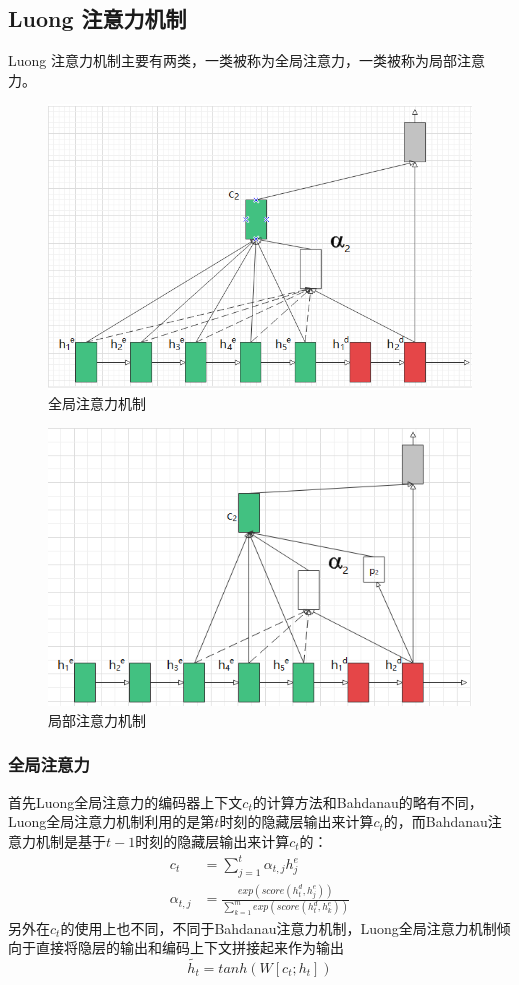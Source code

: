 \documentclass[twoside,a4paper,12pt]{book}%
\begin{document}
\subsection{Luong 注意力机制}
Luong 注意力机制主要有两类，一类被称为全局注意力，一类被称为局部注意力。
\begin{figure}[htbp]
\centering
\includegraphics[width=5.4in]{nmt-atn-lstm1.png}
\caption{全局注意力机制}
\end{figure}
\begin{figure}[htbp]
\centering
\includegraphics[width=5.4in]{nmt-atn-lstm2.png}
\caption{局部注意力机制}
\end{figure}

\subsubsection{全局注意力}
首先Luong全局注意力的编码器上下文$c_t$的计算方法和Bahdanau的略有不同，Luong全局注意力机制利用的是第$t$时刻的隐藏层输出来计算$c_t$的，而Bahdanau注意力机制是基于$t-1$时刻的隐藏层输出来计算$c_t$的：
$$
\begin{aligned}
c_t&=\sum_{j=1}^{t}{\alpha_{t,j}h^e_j}\\
\alpha_{t,j} &= \frac{exp(score(h^d_{t},h^e_j))}{\sum_{k=1}^{m}{exp(score(h^d_{t},h^e_k))}}
\end{aligned}
$$
另外在$c_t$的使用上也不同，不同于Bahdanau注意力机制，Luong全局注意力机制倾向于直接将隐层的输出和编码上下文拼接起来作为输出
$$
\widetilde{h_t} = tanh(W[c_t;h_t])
$$
\end{document}

